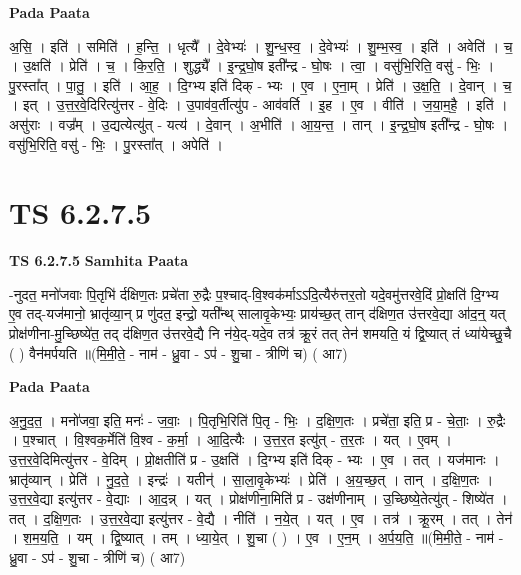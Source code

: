 \documentclass[17pt]{extarticle}
\begin{document}
\textbf{Pada Paata} \newline

अ॒सि॒ । इति॑ । समिति॑ । ह॒न्ति॒ । धृत्यै᳚ । दे॒वेभ्यः॑ । शु॒न्ध॒स्व॒ । दे॒वेभ्यः॑ । शु॒म्भ॒स्व॒ । इति॑ । अवेति॑ । च॒ । उ॒क्षति॑ । प्रेति॑ । च॒ । कि॒र॒ति॒ । शुद्ध्यै᳚ । इ॒न्द्र॒घो॒ष इती᳚न्द्र - घो॒षः । त्वा॒ । वसु॑भि॒रिति॒ वसु॑ - भिः॒ । पु॒रस्ता᳚त् । पा॒तु॒ । इति॑ । आ॒ह॒ । दि॒ग्भ्य इति॑ दिक् - भ्यः । ए॒व । ए॒ना॒म् । प्रेति॑ । उ॒क्ष॒ति॒ । दे॒वान् । च॒ । इत् । उ॒त्त॒र॒वे॒दिरित्यु॑त्तर - वे॒दिः । उ॒पाव॑व॒र्तीत्यु॑प - आव॑वर्ति । इ॒ह । ए॒व । वीति॑ । ज॒या॒म॒है॒ । इति॑ । असु॑राः । वज्र᳚म् । उ॒द्यत्येत्यु॑त् - यत्य॑ । दे॒वान् । अ॒भीति॑ । आ॒य॒न्त॒ । तान् । इ॒न्द्र॒घो॒ष इती᳚न्द्र - घो॒षः । वसु॑भि॒रिति॒ वसु॑ - भिः॒ । पु॒रस्ता᳚त् । अपेति॑ ।  \newline





\section{ TS 6.2.7.5 }

\textbf{TS 6.2.7.5 } \newline
\textbf{Samhita Paata} \newline

-नुदत॒ मनो॑जवाः पि॒तृभि॑ र्दक्षिण॒तः प्रचे॑ता रु॒द्रैः प॒श्चाद्-वि॒श्वक॑र्माऽऽदि॒त्यैरु॑त्तर॒तो यदे॒वमु॑त्तरवे॒दिं प्रो॒क्षति॑ दि॒ग्भ्य ए॒व तद्-यज॑मानो॒ भ्रातृ॑व्या॒न् प्र णु॑दत॒ इन्द्रो॒ यती᳚न्थ् सालावृ॒केभ्यः॒ प्राय॑च्छ॒त् तान् द॑क्षिण॒त उ॑त्तरवे॒द्या आ॑द॒न्॒ यत् प्रोक्ष॑णीना-मु॒च्छिष्ये॑त॒ तद् द॑क्षिण॒त उ॑त्तरवे॒द्यै नि न॑ये॒द्-यदे॒व तत्र॑ क्रू॒रं तत् तेन॑ शमयति॒ यं द्वि॒ष्यात् तं ध्या॑येच्छु॒चै ( ) वैन॑मर्पयति ॥(मि॒मी॒ते॒ - नाम॑ - ध्रु॒वा - ऽप॑ - शु॒चा - त्रीणि॑ च) ( आ7) \newline

\textbf{Pada Paata} \newline

अ॒नु॒द॒त॒ । मनो॑जवा॒ इति॒ मनः॑ - ज॒वाः॒ । पि॒तृभि॒रिति॑ पि॒तृ - भिः॒ । द॒क्षि॒ण॒तः । प्रचे॑ता॒ इति॒ प्र - चे॒ताः॒ । रु॒द्रैः । प॒श्चात् । वि॒श्वक॒र्मेति॑ वि॒श्व - क॒र्मा॒ । आ॒दि॒त्यैः । उ॒त्त॒र॒त इत्यु॑त् - त॒र॒तः । यत् । ए॒वम् । उ॒त्त॒र॒वे॒दिमित्यु॑त्तर - वे॒दिम् । प्रो॒क्षतीति॑ प्र - उ॒क्षति॑ । दि॒ग्भ्य इति॑ दिक् - भ्यः । ए॒व । तत् । यज॑मानः । भ्रातृ॑व्यान् । प्रेति॑ । नु॒द॒ते॒ । इन्द्रः॑ । यतीन्॑ । सा॒ला॒वृ॒केभ्यः॑ । प्रेति॑ । अ॒य॒च्छ॒त् । तान् । द॒क्षि॒ण॒तः । उ॒त्त॒र॒वे॒द्या इत्यु॑त्तर - वे॒द्याः । आ॒द॒न्न् । यत् । प्रोक्ष॑णीना॒मिति॑ प्र - उक्ष॑णीनाम् । उ॒च्छिष्ये॒तेत्यु॑त् - शिष्ये॑त । तत् । द॒क्षि॒ण॒तः । उ॒त्त॒र॒वे॒द्या इत्यु॑त्तर - वे॒द्यै । नीति॑ । न॒ये॒त् । यत् । ए॒व । तत्र॑ । क्रू॒रम् । तत् । तेन॑ । श॒म॒य॒ति॒ । यम् । द्वि॒ष्यात् । तम् । ध्या॒ये॒त् । शु॒चा ( ) । ए॒व । ए॒न॒म् । अ॒र्प॒य॒ति॒ ॥(मि॒मी॒ते॒ - नाम॑ - ध्रु॒वा - ऽप॑ - शु॒चा - त्रीणि॑ च) ( आ7)  \newline
\end{document}
